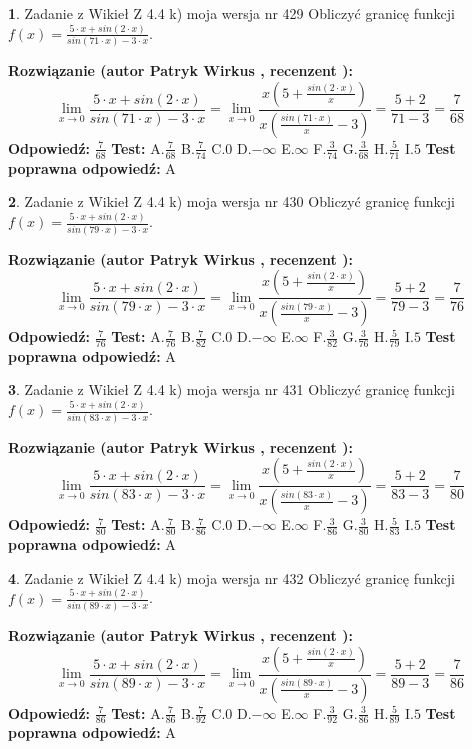 \documentclass[12pt, a4paper]{article}
\theoremstyle{definition} %
\newtheorem{zad}{}
\newcommand{\zadStart}[1]{\begin{zad}#1\newline}
\newcommand{\zadStop}{\end{zad}}
\newcommand{\rozwStart}[2]{\noindent \textbf{Rozwiązanie (autor #1 , recenzent #2): }\newline}
\newcommand{\rozwStop}{\newline}
\newcommand{\odpStart}{\noindent \textbf{Odpowiedź:}\newline}
\newcommand{\odpStop}{\newline}
\newcommand{\testStart}{\noindent \textbf{Test:}\newline}
\newcommand{\testStop}{\newline}
\newcommand{\kluczStart}{\noindent \textbf{Test poprawna odpowiedź:}\newline}
\newcommand{\kluczStop}{\newline}
\begin{document}
\zadStart{Zadanie z Wikieł Z 4.4 k) moja wersja nr 429}
Obliczyć granicę funkcji $f(x)=\frac{5\cdot x +sin(2\cdot x)}{sin(71\cdot x) -3\cdot x}$.
\zadStop
\rozwStart{Patryk Wirkus}{}
$$\lim\limits_{x\to 0}\frac{5\cdot x +sin(2\cdot x)}{sin(71\cdot x) -3\cdot x}
=\lim\limits_{x\to 0}\frac{x(5+\frac{sin(2\cdot x)}{x})}{x(\frac{sin(71\cdot x)}{x}-3)}
=\frac{5+2}{71-3} = \frac{7}{68}$$
\rozwStop
\odpStart
$\frac{7}{68}$
\odpStop
\testStart
A.$\frac{7}{68}$
B.$\frac{7}{74}$
C.$0$
D.$-\infty$
E.$\infty$
F.$\frac{3}{74}$
G.$\frac{3}{68}$
H.$\frac{5}{71}$
I.$5$
\testStop
\kluczStart
A
\kluczStop



\zadStart{Zadanie z Wikieł Z 4.4 k) moja wersja nr 430}
Obliczyć granicę funkcji $f(x)=\frac{5\cdot x +sin(2\cdot x)}{sin(79\cdot x) -3\cdot x}$.
\zadStop
\rozwStart{Patryk Wirkus}{}
$$\lim\limits_{x\to 0}\frac{5\cdot x +sin(2\cdot x)}{sin(79\cdot x) -3\cdot x}
=\lim\limits_{x\to 0}\frac{x(5+\frac{sin(2\cdot x)}{x})}{x(\frac{sin(79\cdot x)}{x}-3)}
=\frac{5+2}{79-3} = \frac{7}{76}$$
\rozwStop
\odpStart
$\frac{7}{76}$
\odpStop
\testStart
A.$\frac{7}{76}$
B.$\frac{7}{82}$
C.$0$
D.$-\infty$
E.$\infty$
F.$\frac{3}{82}$
G.$\frac{3}{76}$
H.$\frac{5}{79}$
I.$5$
\testStop
\kluczStart
A
\kluczStop



\zadStart{Zadanie z Wikieł Z 4.4 k) moja wersja nr 431}
Obliczyć granicę funkcji $f(x)=\frac{5\cdot x +sin(2\cdot x)}{sin(83\cdot x) -3\cdot x}$.
\zadStop
\rozwStart{Patryk Wirkus}{}
$$\lim\limits_{x\to 0}\frac{5\cdot x +sin(2\cdot x)}{sin(83\cdot x) -3\cdot x}
=\lim\limits_{x\to 0}\frac{x(5+\frac{sin(2\cdot x)}{x})}{x(\frac{sin(83\cdot x)}{x}-3)}
=\frac{5+2}{83-3} = \frac{7}{80}$$
\rozwStop
\odpStart
$\frac{7}{80}$
\odpStop
\testStart
A.$\frac{7}{80}$
B.$\frac{7}{86}$
C.$0$
D.$-\infty$
E.$\infty$
F.$\frac{3}{86}$
G.$\frac{3}{80}$
H.$\frac{5}{83}$
I.$5$
\testStop
\kluczStart
A
\kluczStop



\zadStart{Zadanie z Wikieł Z 4.4 k) moja wersja nr 432}
Obliczyć granicę funkcji $f(x)=\frac{5\cdot x +sin(2\cdot x)}{sin(89\cdot x) -3\cdot x}$.
\zadStop
\rozwStart{Patryk Wirkus}{}
$$\lim\limits_{x\to 0}\frac{5\cdot x +sin(2\cdot x)}{sin(89\cdot x) -3\cdot x}
=\lim\limits_{x\to 0}\frac{x(5+\frac{sin(2\cdot x)}{x})}{x(\frac{sin(89\cdot x)}{x}-3)}
=\frac{5+2}{89-3} = \frac{7}{86}$$
\rozwStop
\odpStart
$\frac{7}{86}$
\odpStop
\testStart
A.$\frac{7}{86}$
B.$\frac{7}{92}$
C.$0$
D.$-\infty$
E.$\infty$
F.$\frac{3}{92}$
G.$\frac{3}{86}$
H.$\frac{5}{89}$
I.$5$
\testStop
\kluczStart
A
\kluczStop
\end{document}
